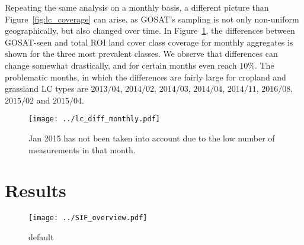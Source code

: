 \documentclass[preprint, a4paper, 10pt, times]{elsarticle}
\begin{document}
Repeating the same analysis on a monthly basis, a different picture than Figure~\ref{fig:lc_coverage} can arise, as GOSAT's sampling is not only non-uniform geographically, but also changed over time. In Figure~\ref{fig:lc_diff_monthly}, the differences between GOSAT-seen and total ROI land cover class coverage for monthly aggregates is shown for the three most prevalent classes. We observe that differences can change somewhat drastically, and for certain months even reach $10\%$. The problematic months, in which the differences are fairly large for cropland and grassland LC types are $2013/04$, $2014/02$, $2014/03$, $2014/04$, $2014/11$, $2016/08$, $2015/02$ and $2015/04$.

\begin{figure}[htbp]
\centering
\texttt{[image: ../lc\_diff\_monthly.pdf]}
\caption{Jan 2015 has not been taken into account due to the low number of measurements in that month.}
\label{fig:lc_diff_monthly}
\end{figure}



 
\section{Results}

\begin{figure}[htbp]
\centering
\texttt{[image: ../SIF\_overview.pdf]}
\caption{default}
\label{fig:sif_ts}
\end{figure}



\section*{}

\end{document}
